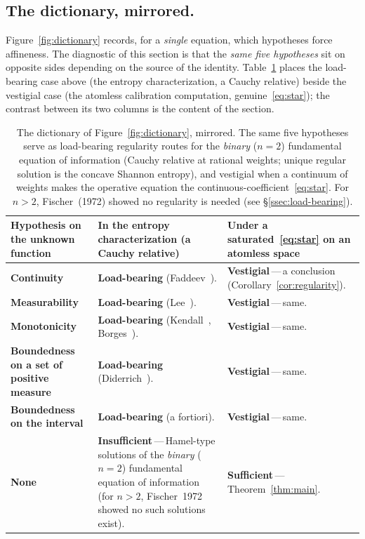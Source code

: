 \documentclass{article}
\theoremstyle{plain}
\theoremstyle{definition}
\begin{document}
\subsection{The dictionary, mirrored.}
\label{ssec:mirror}

Figure~\ref{fig:dictionary} records, for a \emph{single} equation,
which hypotheses force affineness. The diagnostic of this section is
that the \emph{same five hypotheses} sit on opposite sides depending
on the source of the identity. Table~\ref{tab:mirror} places the
load-bearing case above (the entropy
characterization, a Cauchy relative) beside the vestigial case
(the atomless calibration computation,
genuine~\eqref{eq:star}); the contrast between its two columns is
the content of the section.

\begin{table}[ht]
\renewcommand{\arraystretch}{1.4}
\centering
\begin{tabularx}{\linewidth}{@{} >{\raggedright\arraybackslash}X
  >{\raggedright\arraybackslash}X
  >{\raggedright\arraybackslash}X @{}}
\toprule
\textbf{Hypothesis on the unknown function} &
\textbf{In the entropy characterization (a Cauchy relative)} &
\textbf{Under a saturated~\eqref{eq:star} on an atomless space} \\
\midrule
\textbf{Continuity}
  & \textbf{Load-bearing} (Faddeev~\cite{Faddeev1957}).
  & \textbf{Vestigial}\,---\,a conclusion (Corollary~\ref{cor:regularity}). \\
\midrule
\textbf{Measurability}
  & \textbf{Load-bearing} (Lee~\cite{Lee1964}).
  & \textbf{Vestigial}\,---\,same. \\
\midrule
\textbf{Monotonicity}
  & \textbf{Load-bearing} (Kendall~\cite{Kendall1964}, Borges~\cite{Borges1967}).
  & \textbf{Vestigial}\,---\,same. \\
\midrule
\textbf{Boundedness on a set of positive measure}
  & \textbf{Load-bearing} (Diderrich~\cite{Diderrich1975}).
  & \textbf{Vestigial}\,---\,same. \\
\midrule
\textbf{Boundedness on the interval}
  & \textbf{Load-bearing} (a fortiori).
  & \textbf{Vestigial}\,---\,same. \\
\midrule
\textbf{None}
  & \textbf{Insufficient}\,---\,Hamel-type solutions of the \emph{binary} ($n{=}2$) fundamental equation of information~\cite{AczelDaroczy1975} (for $n{>}2$, Fischer~1972 showed no such solutions exist).
  & \textbf{Sufficient}\,---\,Theorem~\ref{thm:main}. \\
\bottomrule
\end{tabularx}
\caption{The dictionary of Figure~\ref{fig:dictionary}, mirrored. The
same five hypotheses serve as load-bearing regularity routes for the \emph{binary} ($n{=}2$)
fundamental equation of information (Cauchy relative at rational weights;
unique regular solution is the concave Shannon entropy), and vestigial
when a continuum of weights makes the operative equation the
continuous-coefficient~\eqref{eq:star}. For $n{>}2$, Fischer~(1972)
showed no regularity is needed (see \S\ref{ssec:load-bearing}).}
\label{tab:mirror}
\end{table}
\end{document}
